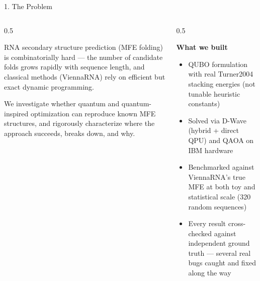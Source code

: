 \documentclass[aspectratio=169,10pt]{beamer}
\begin{document}
\begin{frame}{1. The Problem}
  \begin{columns}[T]
    \begin{column}{0.5\textwidth}
      \begin{cardbox}
      RNA secondary structure prediction (MFE folding) is combinatorially hard --- the number of candidate folds grows rapidly with sequence length, and classical methods (ViennaRNA) rely on efficient but exact dynamic programming.
      \end{cardbox}
      \vspace{0.4cm}
      \begin{cardbox}
      We investigate whether quantum and quantum-inspired optimization can reproduce known MFE structures, and rigorously characterize where the approach succeeds, breaks down, and why.
      \end{cardbox}
    \end{column}
    \begin{column}{0.5\textwidth}
      \begin{cardbox}
      \textbf{\color{navy}What we built}
      \vspace{4pt}
      \begin{itemize}
        \item QUBO formulation with real Turner2004 stacking energies (not tunable heuristic constants)
        \item Solved via D-Wave (hybrid + direct QPU) and QAOA on IBM hardware
        \item Benchmarked against ViennaRNA's true MFE at both toy and statistical scale (320 random sequences)
        \item Every result cross-checked against independent ground truth --- several real bugs caught and fixed along the way
      \end{itemize}
      \end{cardbox}
    \end{column}
  \end{columns}
\end{frame}
\end{document}
